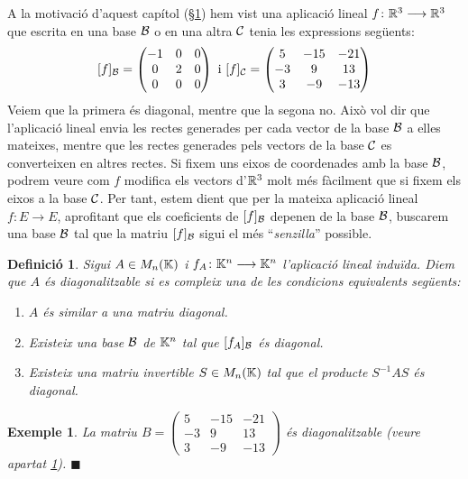 \documentclass[
  11pt,
]{book}
\numberwithin{dummy}{section}
\theoremstyle{maincolornumbox}
\theoremstyle{blacknumex}
\newtheorem{exampleT}{Exemple}[chapter]
\theoremstyle{blacknumbox}
\newtheorem{definitionT}{Definició}[chapter]
\theoremstyle{maincolornum}
\newenvironment{definition}{\begin{dBox}\begin{definitionT}}{\end{definitionT}\end{dBox}}
\newenvironment{example}{\begin{exampleT}}{\hfill{\tiny\ensuremath{\blacksquare}}\end{exampleT}}
\begin{document}
A la motivació d'aquest capítol
(§\hyperref[subsec:motiv-diag]{1}) hem vist una aplicació lineal
\(f\colon \mathbb{R}^3\longrightarrow \mathbb{R}^3\) que escrita en una base \(\mathcal{B}\) o en una altra
\(\mathcal{C}\) tenia les expressions següents: \[[f]_{\mathcal{B}}=\begin{pmatrix}
-1 & 0 & 0 \\ 0 & 2 & 0 \\ 0 & 0 & 0
\end{pmatrix}
\text{ i }
[f]_{\mathcal{C}}=\begin{pmatrix}
5 & -15 & -21 \\ -3 & 9 & 13 \\ 3 & -9 & -13
\end{pmatrix}\] Veiem que la primera és diagonal, mentre que la segona
no. Això vol dir que l'aplicació lineal envia les rectes generades per
cada vector de la base \(\mathcal{B}\) a elles mateixes, mentre que les rectes
generades pels vectors de la base \(\mathcal{C}\) es converteixen en altres
rectes. Si fixem uns eixos de coordenades amb la base \(\mathcal{B}\), podrem
veure com \(f\) modifica els vectors d'\(\mathbb{R}^3\) molt més fàcilment que si
fixem els eixos a la base \(\mathcal{C}\). Per tant, estem dient que per la
mateixa aplicació lineal \(f\colon E \to E\), aprofitant que els
coeficients de \([f]_{\mathcal{B}}\) depenen de la base \(\mathcal{B}\), buscarem una base
\(\mathcal{B}\) tal que la matriu \([f]_{\mathcal{B}}\) sigui el més ``\emph{senzilla}''
possible.

\begin{definition}

Sigui \(A \in M_n(\mathbb{K})\) i \(f_A\colon \mathbb{K}^n\longrightarrow\mathbb{K}^n\) l'aplicació lineal
induïda. Diem que \emph{\(A\) és diagonalitzable} si es compleix una de les
condicions equivalents següents:

\begin{enumerate}
\def\labelenumi{\arabic{enumi}.}
\item
  \(A\) és similar a una matriu diagonal.
\item
  Existeix una base \(\mathcal{B}\) de \(\mathbb{K}^n\) tal que \([f_A]_{\mathcal{B}}\) és
  diagonal.
\item
  Existeix una matriu invertible \(S\in M_n(\mathbb{K})\) tal que el producte
  \(S^{-1}AS\) és diagonal.
\end{enumerate}

\end{definition}

\begin{example}
La matriu \(B=\left(\begin{smallmatrix}
5 & -15 & -21 \\ -3 & 9 & 13 \\ 3 & -9 & -13
\end{smallmatrix}\right)\) és diagonalitzable (veure apartat
\hyperref[subsec:motiv-diag]{1}).
\end{example}
\end{document}
